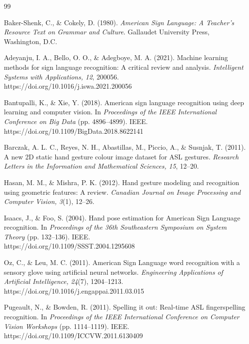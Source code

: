 \begin{thebibliography}{99}

Baker-Shenk, C., \& Cokely, D. (1980). \textit{American Sign Language: A Teacher's Resource Text on Grammar and Culture}. Gallaudet University Press, Washington, D.C.

Adeyanju, I. A., Bello, O. O., \& Adegboye, M. A. (2021). Machine learning methods for sign language recognition: A critical review and analysis. \textit{Intelligent Systems with Applications, 12}, 200056. \\
https://doi.org/10.1016/j.iswa.2021.200056

Bantupalli, K., \& Xie, Y. (2018). American sign language recognition using deep learning and computer vision. In \textit{Proceedings of the IEEE International Conference on Big Data} (pp. 4896--4899). IEEE. \\
https://doi.org/10.1109/BigData.2018.8622141

Barczak, A. L. C., Reyes, N. H., Abastillas, M., Piccio, A., \& Susnjak, T. (2011). A new 2D static hand gesture colour image dataset for ASL gestures. \textit{Research Letters in the Information and Mathematical Sciences, 15}, 12--20.

Hasan, M. M., \& Mishra, P. K. (2012). Hand gesture modeling and recognition using geometric features: A review. \textit{Canadian Journal on Image Processing and Computer Vision, 3}(1), 12--26.

Isaacs, J., \& Foo, S. (2004). Hand pose estimation for American Sign Language recognition. In \textit{Proceedings of the 36th Southeastern Symposium on System Theory} (pp. 132--136). IEEE. \\
https://doi.org/10.1109/SSST.2004.1295608

Oz, C., \& Leu, M. C. (2011). American Sign Language word recognition with a sensory glove using artificial neural networks. \textit{Engineering Applications of Artificial Intelligence, 24}(7), 1204--1213. \\
https://doi.org/10.1016/j.engappai.2011.03.015

Pugeault, N., \& Bowden, R. (2011). Spelling it out: Real-time ASL fingerspelling recognition. In \textit{Proceedings of the IEEE International Conference on Computer Vision Workshops} (pp. 1114--1119). IEEE. \\
https://doi.org/10.1109/ICCVW.2011.6130409


\end{thebibliography}
